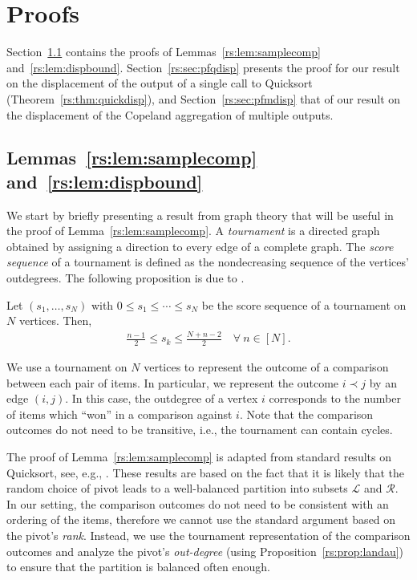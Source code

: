 \section{Proofs}  %
\label{rs:sec:proofs}

Section~\ref{rs:sec:pflemmas} contains the proofs of Lemmas~\ref{rs:lem:samplecomp} and~\ref{rs:lem:dispbound}.
Section~\ref{rs:sec:pfqdisp} presents the proof for our result on the displacement of the output of a single call to Quicksort (Theorem~\ref{rs:thm:quickdisp}), and Section~\ref{rs:sec:pfmdisp} that of our result on the displacement of the Copeland aggregation of multiple outputs.

\subsection{Lemmas~\ref{rs:lem:samplecomp} and~\ref{rs:lem:dispbound}}
\label{rs:sec:pflemmas}

We start by briefly presenting a result from graph theory that will be useful in the proof of Lemma~\ref{rs:lem:samplecomp}.
A \emph{tournament} is a directed graph obtained by assigning a direction to every edge of a complete graph.
The \emph{score sequence} of a tournament is defined as the nondecreasing sequence of the vertices' outdegrees.
The following proposition is due to \citet{landau1953dominance}.

\begin{proposition}
\label{rs:prop:landau}
Let $(s_1, \ldots, s_N)$ with $0 \le s_1 \le \cdots \le s_N$ be the score sequence of a tournament on $N$ vertices.
Then,
\begin{align*}
\frac{n - 1}{2} \le s_k \le \frac{N + n - 2}{2} \quad \forall\ n \in [N].
\end{align*}
\end{proposition}

We use a tournament on $N$ vertices to represent the outcome of a comparison between each pair of items.
In particular, we represent the outcome $i \prec j$ by an edge $(i, j)$.
In this case, the outdegree of a vertex $i$ corresponds to the number of items which ``won'' in a comparison against $i$.
Note that the comparison outcomes do not need to be transitive, i.e., the tournament can contain cycles.

The proof of Lemma~\ref{rs:lem:samplecomp} is adapted from standard results on Quicksort, see, e.g., \citet[][Section 3.3.3]{dubhashi2009concentration}.
These results are based on the fact that it is likely that the random choice of pivot leads to a well-balanced partition into subsets $\mathcal{L}$ and $\mathcal{R}$.
In our setting, the comparison outcomes do not need to be consistent with an ordering of the items, therefore we cannot use the standard argument based on the pivot's \emph{rank}.
Instead, we use the tournament representation of the comparison outcomes and analyze the pivot's \emph{out-degree} (using Proposition~\ref{rs:prop:landau}) to ensure that the partition is balanced often enough.


